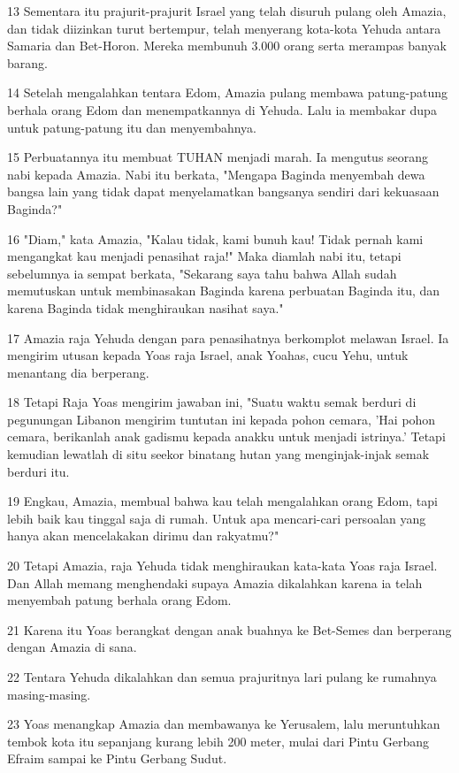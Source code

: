 \par 13 Sementara itu prajurit-prajurit Israel yang telah disuruh pulang oleh Amazia, dan tidak diizinkan turut bertempur, telah menyerang kota-kota Yehuda antara Samaria dan Bet-Horon. Mereka membunuh 3.000 orang serta merampas banyak barang.
\par 14 Setelah mengalahkan tentara Edom, Amazia pulang membawa patung-patung berhala orang Edom dan menempatkannya di Yehuda. Lalu ia membakar dupa untuk patung-patung itu dan menyembahnya.
\par 15 Perbuatannya itu membuat TUHAN menjadi marah. Ia mengutus seorang nabi kepada Amazia. Nabi itu berkata, "Mengapa Baginda menyembah dewa bangsa lain yang tidak dapat menyelamatkan bangsanya sendiri dari kekuasaan Baginda?"
\par 16 "Diam," kata Amazia, "Kalau tidak, kami bunuh kau! Tidak pernah kami mengangkat kau menjadi penasihat raja!" Maka diamlah nabi itu, tetapi sebelumnya ia sempat berkata, "Sekarang saya tahu bahwa Allah sudah memutuskan untuk membinasakan Baginda karena perbuatan Baginda itu, dan karena Baginda tidak menghiraukan nasihat saya."
\par 17 Amazia raja Yehuda dengan para penasihatnya berkomplot melawan Israel. Ia mengirim utusan kepada Yoas raja Israel, anak Yoahas, cucu Yehu, untuk menantang dia berperang.
\par 18 Tetapi Raja Yoas mengirim jawaban ini, "Suatu waktu semak berduri di pegunungan Libanon mengirim tuntutan ini kepada pohon cemara, 'Hai pohon cemara, berikanlah anak gadismu kepada anakku untuk menjadi istrinya.' Tetapi kemudian lewatlah di situ seekor binatang hutan yang menginjak-injak semak berduri itu.
\par 19 Engkau, Amazia, membual bahwa kau telah mengalahkan orang Edom, tapi lebih baik kau tinggal saja di rumah. Untuk apa mencari-cari persoalan yang hanya akan mencelakakan dirimu dan rakyatmu?"
\par 20 Tetapi Amazia, raja Yehuda tidak menghiraukan kata-kata Yoas raja Israel. Dan Allah memang menghendaki supaya Amazia dikalahkan karena ia telah menyembah patung berhala orang Edom.
\par 21 Karena itu Yoas berangkat dengan anak buahnya ke Bet-Semes dan berperang dengan Amazia di sana.
\par 22 Tentara Yehuda dikalahkan dan semua prajuritnya lari pulang ke rumahnya masing-masing.
\par 23 Yoas menangkap Amazia dan membawanya ke Yerusalem, lalu meruntuhkan tembok kota itu sepanjang kurang lebih 200 meter, mulai dari Pintu Gerbang Efraim sampai ke Pintu Gerbang Sudut.
